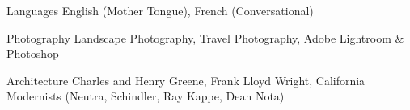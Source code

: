 

\begin{cvskills}

  \cvskill
    {Languages} %
    {English (Mother Tongue), French (Conversational)} %

  \cvskill
    {Photography} %
    {Landscape Photography, Travel Photography, Adobe Lightroom \& Photoshop} %

  \cvskill
    {Architecture} %
    {Charles and Henry Greene, Frank Lloyd Wright, California Modernists (Neutra, Schindler, Ray Kappe, Dean Nota)} %

\end{cvskills}
